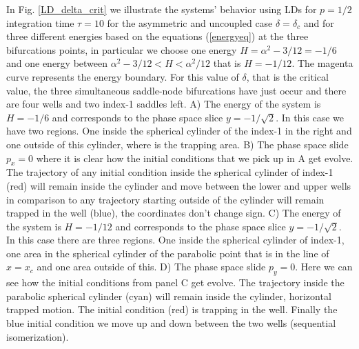 \documentclass[10pt,aps,onecolumn,superscriptaddress]{revtex4-2}
\begin{document}
In Fig. \ref{LD_delta_crit} we illustrate the systems' behavior using LDs for $p = 1/2$ integration time $\tau = 10$ for the asymmetric and uncoupled case $\delta = \delta_c$ and for three different energies based on the equations (\ref{energyeq}) at the three bifurcations points, in particular we choose one energy $H = \alpha^{2}-3/12 =-1/6$ and one energy between $\alpha^{2}-3/12<H<\alpha^{2}/12$ that is $H = -1/12$. The magenta curve represents the energy boundary. For this value of $\delta$, that is the critical value, the three simultaneous saddle-node bifurcations have just occur and there are four wells and two index-1 saddles left. A) The energy of the system is $H = -1/6$ and corresponds to the phase space slice $y = -1/\sqrt{2}$. In this case we have two regions. One inside the spherical cylinder of the index-1 in the right and one outside of this cylinder, where is the trapping area. B) The phase space slide $p_x = 0$ where it is clear how the initial conditions that we pick up in A get evolve. The trajectory of any initial condition inside the spherical cylinder of index-1 (red) will remain inside the cylinder and move between the lower and upper wells in comparison to any trajectory starting outside of the cylinder will remain trapped in the well (blue), the coordinates don't change sign. C) The energy of the system is $H = -1/12$ and corresponds to the phase space slice $y = -1/\sqrt{2}$. In this case there are three regions. One inside the spherical cylinder of index-1, one area in the spherical cylinder of the parabolic point that is in the line of $x = x_{c}$ and one area outside of this. D) The phase space slide $p_y = 0$. Here we can see how the initial conditions from panel C get evolve. The trajectory inside the parabolic spherical cylinder (cyan) will remain inside the cylinder, horizontal trapped motion. The initial condition (red) is trapping in the well. Finally the blue initial condition we move up and down between the two wells (sequential isomerization).
\end{document}
